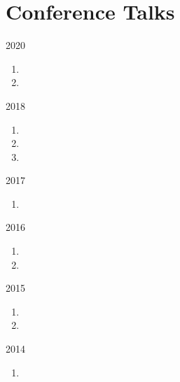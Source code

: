 \section*{Conference Talks}

\begin{paracol}{2}
  2020
\switchcolumn
  \begin{enumerate}
    \setcounter{enumi}{\thepubcounter}
    \item {}
    \item {}
    \setcounter{pubcounter}{\theenumi}
  \end{enumerate}
\end{paracol}

\begin{paracol}{2}
  2018
\switchcolumn
  \begin{enumerate}
    \setcounter{enumi}{\thepubcounter}
    \item {}
    \item {}
    \item {}
    \setcounter{pubcounter}{\theenumi}
  \end{enumerate}
\end{paracol}

\begin{paracol}{2}
  2017
\switchcolumn
  \begin{enumerate}
    \setcounter{enumi}{\thepubcounter}
    \item {}
    \setcounter{pubcounter}{\theenumi}
  \end{enumerate}
\end{paracol}

\begin{paracol}{2}
  2016
\switchcolumn
  \begin{enumerate}
    \setcounter{enumi}{\thepubcounter}
    \item {}
    \item {}
    \setcounter{pubcounter}{\theenumi}
  \end{enumerate}
\end{paracol}

\begin{paracol}{2}
  2015
\switchcolumn
  \begin{enumerate}
    \setcounter{enumi}{\thepubcounter}
    \item {}
    \item {}
    \setcounter{pubcounter}{\theenumi}
  \end{enumerate}
\end{paracol}

\begin{paracol}{2}
  2014
\switchcolumn
  \begin{enumerate}
    \setcounter{enumi}{\thepubcounter}
    \item {}
    \setcounter{pubcounter}{\theenumi}
  \end{enumerate}
\end{paracol}
